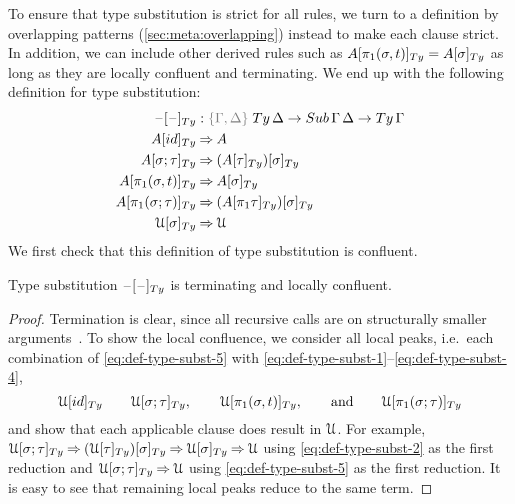 \documentclass[a4paper,UKenglish,numberwithinsect,cleveref,thm-restate]{lipics-v2021}
\newcommand{\danger}{\marginpar[\hfill\dbend]{\dbend\hfill}}
\begin{document}
To ensure that type substitution is strict for all %
{rules}, we turn to a definition by overlapping patterns (\cref{sec:meta:overlapping}) instead to make each clause strict. 
In addition, we can include other derived rules such as $\subTy{A}{\pi_1(\sigma, t)} = \subTy{A}{\sigma}$ as long as they are locally confluent and terminating.
We end up with the following definition for type substitution:
\begin{alignat}{3}
\subTy{\blank}{\blank}            &: \implicit{\Gamma, \Delta} \; \Ty\,\Delta \to \Sub\,\Gamma\,\Delta \to \Ty\,\Gamma \nonumber \\
\subTy{A}{\idS}                & \reduce A \label{eq:def-type-subst-1}\\
\subTy{A}{\sigma ; \tau}       & \reduce \subTy{(\subTy{A}{\tau})}{\sigma} \label{eq:def-type-subst-2}\\
\subTy{A}{\pi_1(\sigma, t)}    & \reduce \subTy{A}{\sigma} \label{eq:def-type-subst-3} \\
\subTy{A}{\pi_1(\sigma; \tau)} & \reduce \subTy{(\subTy{A}{\pi_1\tau})}{\sigma} \label{eq:def-type-subst-4} \\
\subTy{\UU}{\sigma}            & \reduce \UU                                   \label{eq:def-type-subst-5}
\end{alignat}
We first check that this definition of type substitution is confluent.
%
\begin{proposition}\label{prop:local-confluence-1}
  Type substitution $\subTy{\blank}{\blank}$ is terminating and locally confluent.
  \danger
\end{proposition}
\begin{proof}
  Termination is clear, since all recursive calls are on structurally smaller arguments~\cite{Abel2002}.
  To show the local confluence, we consider all local peaks, i.e.\ each combination of \eqref{eq:def-type-subst-5} with \eqref{eq:def-type-subst-1}--\eqref{eq:def-type-subst-4},
  \[
    \subTy{\UU}{\idS} \qquad \subTy{\UU}{\sigma;\tau}, \qquad \subTy{\UU}{\pi_1(\sigma, t)}, \qquad\text{and}\qquad \subTy{\UU}{\pi_1(\sigma; \tau)}
  \]
  and show that each applicable clause does result in $\mathcal{U}$.
  For example, $\subTy{\UU}{\sigma;\tau} \reduce \subTy{(\subTy{\UU}{\tau})}{\sigma} \reduce \subTy{\UU}{\sigma} \reduce \UU$ using \eqref{eq:def-type-subst-2} as the first reduction and $\subTy{\UU}{\sigma;\tau} \reduce \UU$ using \eqref{eq:def-type-subst-5} as the first reduction.
  It is easy to see that remaining local peaks reduce to the same term.
\end{proof}
\end{document}
